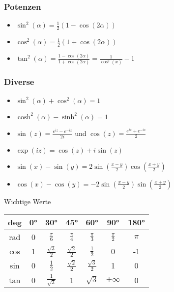\documentclass[a4paper,10pt]{article}
\begin{document}
\subsubsection{Potenzen}
\begin{itemize}
 \item $\sin^2(\alpha) = \frac{1}{2}(1-\cos(2\alpha))$
 \item $\cos^2(\alpha) = \frac{1}{2}(1+\cos(2\alpha))$
 \item $\tan^2(\alpha) = \frac{1-\cos(2\alpha)}{1+\cos(2\alpha)} = \frac{1}{\cos^2(x)} - 1$
\end{itemize}

\subsubsection{Diverse}

\begin{itemize}
 \item $\sin^2(\alpha) + \cos^2(\alpha) = 1$
 \item $\cosh^2(\alpha) - \sinh^2(\alpha) = 1$
 \item $\sin(z) = \frac{e^{iz} - e^{-iz}}{2i}$ und $\cos(z) = \frac{e^{iz} + e^{-iz}}{2}$
 \item $\exp(iz) = \cos(z) + i\sin(z)$
 \item $\sin(x) - \sin(y) = 2\sin(\frac{x - y}{2})\cos(\frac{x + y}{2})$
 \item $\cos(x) - \cos(y) = -2\sin(\frac{x - y}{2})\sin(\frac{x + y}{2})$
\end{itemize}


\begin{mainbox}{Wichtige Werte}
\begin{center} 
 \begin{tabular}{c|cccccc}
  deg & 0° & 30° & 45° & 60° & 90° & 180° \\
  \midrule
  rad & 0 & $\frac{\pi}{6}$ & $\frac{\pi}{4}$ & $\frac{\pi}{3}$ & $\frac{\pi}{2}$ & $\pi$ \\
  cos & 1 & $\frac{\sqrt{3}}{2}$ & $\frac{\sqrt{2}}{2}$ & $\frac{1}{2}$ & 0 & -1 \\
  sin & 0 & $\frac{1}{2}$ & $\frac{\sqrt{2}}{2}$ & $\frac{\sqrt{3}}{2}$ & 1 & 0 \\
  tan & 0 & $\frac{1}{\sqrt{3}}$ & 1 & $\sqrt{3}$ & $+\infty$ & 0 \\
 \end{tabular}
\end{center}
\end{mainbox}
\end{document}
